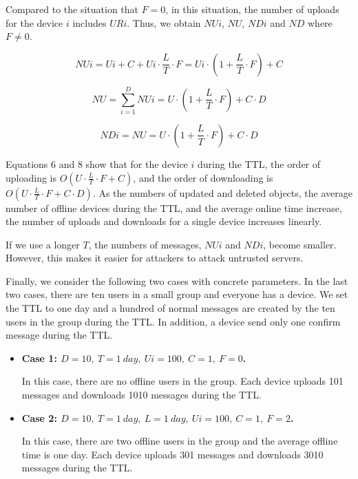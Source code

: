 \documentclass{sig-alternate-05-2015}
\begin{document}
Compared to the situation that $F=0$, in this situation, the number of uploads for the device $i$ includes $URi$.
Thus, we obtain $NUi$, $NU$, $NDi$ and $ND$ where $F \neq 0$.

\begin{equation}
NUi = Ui + C + Ui \cdot \frac{L}{T} \cdot F = Ui \cdot (1 + \frac{L}{T} \cdot F) + C
\end{equation}

\begin{equation}
NU = \sum_{i = 1}^{D} NUi = U \cdot (1 + \frac{L}{T} \cdot F) + C \cdot D
\end{equation}

\begin{equation}
NDi = NU = U \cdot (1 + \frac{L}{T} \cdot F) + C \cdot D
\end{equation}

Equations 6 and 8 show that for the device $i$ during the TTL, the order of uploading is $O(U \cdot \frac{L}{T} \cdot F + C)$, and the order of downloading is $O(U \cdot \frac{L}{T} \cdot F + C \cdot D)$.
As the numbers of updated and deleted objects, the average number of offline devices during the TTL, and the average online time increase, the number of uploads and downloads for a single device increases linearly.

If we use a longer $T$, the numbers of messages, $NUi$ and $NDi$, become smaller.
However, this makes it easier for attackers to attack untrusted servers.

Finally, we consider the following two cases with concrete parameters.
In the last two cases, there are ten users in a small group and everyone has a device.
We set the TTL to one day and a hundred of normal messages are created by the ten users in the group during the TTL.
In addition, a device send only one confirm message during the TTL.

\begin{itemize}[leftmargin=7mm]
	\setlength{\itemsep}{1pt}
	\setlength{\parskip}{0pt}
	\setlength{\parsep}{0pt}
	\item \textbf{Case 1: $D = 10,\ T = 1 \ day,\ Ui = 100,\ C = 1,\ F = 0$.}
	
	In this case, there are no offline users in the group.
	Each device uploads 101 messages and downloads 1010 messages during the TTL.
	\item \textbf{Case 2: $D = 10,\ T = 1 \ day,\ L = 1 \  day,\ Ui = 100,\ C = 1,\ F = 2$.} 
	
	In this case, there are two offline users in the group and the average offline time is one day.
	Each device uploads 301 messages and downloads 3010 messages during the TTL.
\end{itemize}
\end{document}
